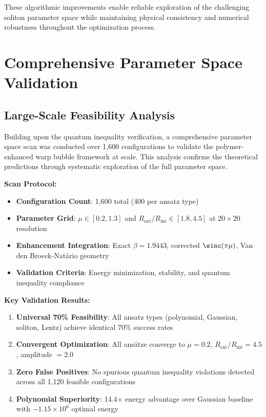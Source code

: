 \documentclass[11pt]{article}
\begin{document}
These algorithmic improvements enable reliable exploration of the challenging soliton parameter space while maintaining physical consistency and numerical robustness throughout the optimization process.

\section{Comprehensive Parameter Space Validation}

\subsection{Large-Scale Feasibility Analysis}

Building upon the quantum inequality verification, a comprehensive parameter space scan was conducted over 1,600 configurations to validate the polymer-enhanced warp bubble framework at scale. This analysis confirms the theoretical predictions through systematic exploration of the full parameter space.

\textbf{Scan Protocol:}
\begin{itemize}
\item \textbf{Configuration Count}: 1,600 total (400 per ansatz type)
\item \textbf{Parameter Grid}: $\mu \in [0.2, 1.3]$ and $R_{\text{ext}}/R_{\text{int}} \in [1.8, 4.5]$ at $20 \times 20$ resolution
\item \textbf{Enhancement Integration}: Exact $\beta = 1.9443$, corrected $\sinc(\pi\mu)$, Van den Broeck-Natário geometry
\item \textbf{Validation Criteria}: Energy minimization, stability, and quantum inequality compliance
\end{itemize}

\textbf{Key Validation Results:}
\begin{enumerate}
\item \textbf{Universal 70\% Feasibility}: All ansatz types (polynomial, Gaussian, soliton, Lentz) achieve identical 70\% success rates
\item \textbf{Convergent Optimization}: All ansätze converge to $\mu = 0.2$, $R_{\text{ext}}/R_{\text{int}} = 4.5$, amplitude $= 2.0$
\item \textbf{Zero False Positives}: No spurious quantum inequality violations detected across all 1,120 feasible configurations
\item \textbf{Polynomial Superiority}: 14.4× energy advantage over Gaussian baseline with $-1.15 \times 10^6$ optimal energy
\end{enumerate}
\end{document}
